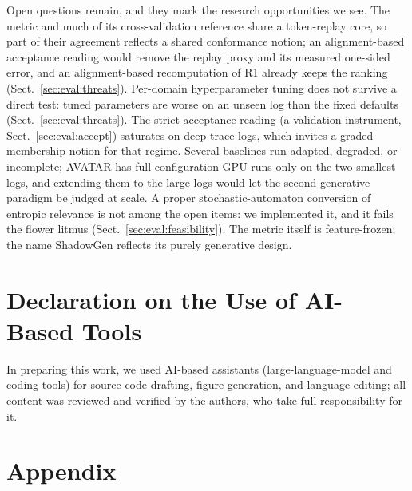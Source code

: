 \documentclass[runningheads]{llncs}
\begin{document}
Open questions remain, and they mark the research opportunities we see. The metric and much of its cross-validation reference share a token-replay core, so part of their agreement reflects a shared conformance notion; an alignment-based acceptance reading would remove the replay proxy and its measured one-sided error, and an alignment-based recomputation of R1 already keeps the ranking (Sect.~\ref{sec:eval:threats}). Per-domain hyperparameter tuning does not survive a direct test: tuned parameters are worse on an unseen log than the fixed defaults (Sect.~\ref{sec:eval:threats}). The strict acceptance reading (a validation instrument, Sect.~\ref{sec:eval:accept}) saturates on deep-trace logs, which invites a graded membership notion for that regime. Several baselines run adapted, degraded, or incomplete; AVATAR has full-configuration GPU runs only on the two smallest logs, and extending them to the large logs would let the second generative paradigm be judged at scale. A proper stochastic-automaton conversion of entropic relevance is not among the open items: we implemented it, and it fails the flower litmus (Sect.~\ref{sec:eval:feasibility}). The metric itself is feature-frozen; the name ShadowGen reflects its purely generative design.

\section*{Declaration on the Use of AI-Based Tools}
In preparing this work, we used AI-based assistants (large-language-model and coding
tools) for source-code drafting, figure generation, and language editing; all content
was reviewed and verified by the authors, who take full responsibility for it.

\appendix
\section*{Appendix}
\end{document}
